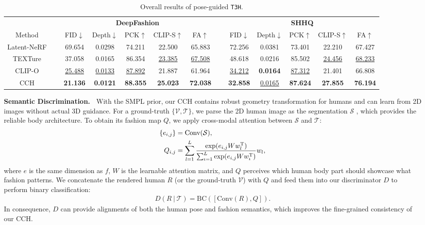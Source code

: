 \documentclass[11pt]{article}
\newcommand{\tablestyle}[2]{\setlength{\tabcolsep}{#1}\renewcommand{\arraystretch}{#2}\centering\footnotesize}
\begin{document}
\begin{table*}[t]
\centering \tablestyle{5pt}{1.1}
    \begin{tabular}{ccccccccccccc}
        \toprule
        ~ & ~ & \multicolumn{5}{c}{\textbf{DeepFashion}} & ~ & \multicolumn{5}{c}{\textbf{SHHQ}} \\
        \cmidrule{3-7} \cmidrule{9-13} Method & ~ & FID$\downarrow$ & Depth$\downarrow$ & PCK$\uparrow$ & CLIP-S$\uparrow$ & FA$\uparrow$ & ~ & FID$\downarrow$ & Depth$\downarrow$ & PCK$\uparrow$ & CLIP-S$\uparrow$ & FA$\uparrow$ \\
        \midrule
        Latent-NeRF & ~ & 69.654 & 0.0298 & 74.211 & 22.500 & 65.883 & ~ & 72.256 & 0.0381 & 73.401 & 22.210 & 67.427 \\
        TEXTure & ~ & 37.058 & 0.0165 & 86.354 & \underline{23.385} & \underline{67.508} & ~ & 48.618 & 0.0216 & 85.502 & \underline{24.456} & \underline{68.233} \\
        CLIP-O & ~ & \underline{25.488} & \underline{0.0133} & \underline{87.892} & 21.887 & 61.964 & ~ & \underline{34.212} & \textbf{0.0164} & \underline{87.312} & 21.401 & 66.808 \\
        CCH & ~ & \textbf{21.136} & \textbf{0.0121} & \textbf{88.355} & \textbf{25.023} & \textbf{72.038} & ~ & \textbf{32.858} & \underline{0.0165} & \textbf{87.624} & \textbf{27.855} & \textbf{76.194} \\
        \bottomrule
    \end{tabular}
    \vspace{-1.5ex}
    \caption{Overall results of pose-guided \texttt{T3H}.}
    \label{table:pose-guide}
    \vspace{-3ex}
\end{table*}

\vspace{1ex} \noindent \textbf{Semantic Discrimination.~}
With the SMPL prior, our CCH contains robust geometry transformation for humans and can learn from 2D images without actual 3D guidance. For a ground-truth $\{\mathcal{V}, \mathcal{T}\}$, we parse the 2D human image as the segmentation $\mathcal{S}$ \cite{mmhuman3d},  which provides the reliable body architecture. To obtain its fashion map $Q$, we apply cross-modal attention between $\mathcal{S}$ and $\mathcal{T}$:
\begin{align}
   \{e_{i, j}\} &= \text{Conv}(\mathcal{S}), \notag \\
   Q_{i, j} &= \sum_{l=1}^L \frac{\exp(e_{i, j}Ww_l^\text{T})}{\sum_{\iota=1}^{L}\exp(e_{i, j}Ww_\iota^\text{T})}w_l, \label{eq:fashion-map}
\end{align}
where $e$ is the same dimension as $f$, $W$ is the learnable attention matrix, and $Q$ perceives which human body part should showcase what fashion patterns. We concatenate the rendered human $R$ (or the ground-truth $\mathcal{V}$) with $Q$ and feed them into our discriminator $D$ to perform binary classification:
\begin{align}
    D(R~|~\mathcal{T}) = \text{BC}([\text{Conv}(R), Q]).
\end{align}
In consequence, $D$ can provide alignments of both the human pose and fashion semantics, which improves the fine-grained consistency of our CCH.
\end{document}
